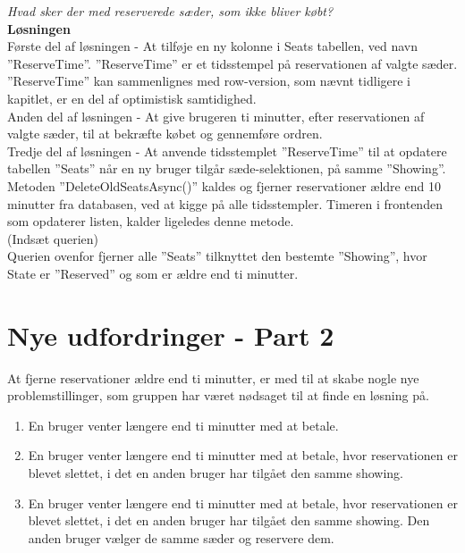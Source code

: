 \textit{Hvad sker der med reserverede sæder, som ikke bliver købt?}\\

\textbf{Løsningen}\\
Første del af løsningen - At tilføje en ny kolonne i Seats tabellen, ved navn 
”ReserveTime”. ”ReserveTime” er et tidsstempel på reservationen af valgte sæder. 
”ReserveTime” kan sammenlignes med row-version, som nævnt tidligere i kapitlet, 
er en del af optimistisk samtidighed.\\ 

Anden del af løsningen - At give brugeren ti minutter, efter reservationen 
af valgte sæder, til at bekræfte købet og gennemføre ordren.\\ 

Tredje del af løsningen - At anvende tidsstemplet ”ReserveTime” til at 
opdatere tabellen ”Seats” når en ny bruger tilgår sæde-selektionen, på samme 
”Showing”. Metoden ”DeleteOldSeatsAsync()” kaldes og fjerner reservationer 
ældre end 10 minutter fra databasen, ved at kigge på alle tidsstempler. 
Timeren i frontenden som opdaterer listen, kalder ligeledes denne metode.\\

(Indsæt querien)\\

Querien ovenfor fjerner alle ”Seats” tilknyttet den bestemte ”Showing”, 
hvor State er ”Reserved” og som er ældre end ti minutter.\\  


\section{Nye udfordringer - Part 2}\label{sec:part1}
At fjerne reservationer ældre end ti minutter, er med til at skabe nogle 
nye problemstillinger, som gruppen har været nødsaget til at finde en løsning på.

\begin{enumerate}
    \item En bruger venter længere end ti minutter med at betale.
    \item En bruger venter længere end ti minutter med at betale, 
    hvor reservationen er blevet slettet, i det en anden bruger har 
    tilgået den samme showing.
    \item En bruger venter længere end ti minutter med at betale, 
    hvor reservationen er blevet slettet, i det en anden bruger har 
    tilgået den samme showing. Den anden bruger vælger de samme sæder 
    og reservere dem.
\end{enumerate}


